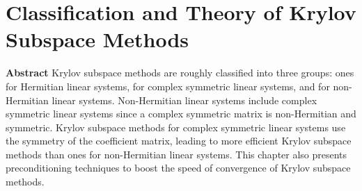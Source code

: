 \clearpage\section{{Classification and Theory of Krylov Subspace Methods}}\label{chap:krylov-classification}
\setcounter{footnote}{0}
\noindent\textbf{{Abstract}}\quad
{Krylov subspace methods are roughly classified into three groups: ones for Hermitian linear systems, for complex symmetric linear systems, and for non-Hermitian linear systems. Non-Hermitian linear systems include complex symmetric linear systems since a complex symmetric matrix is non-Hermitian and symmetric. Krylov subspace methods for complex symmetric linear systems use the symmetry of the coefficient matrix, leading to more efficient Krylov subspace methods than ones for non-Hermitian linear systems. This chapter also presents preconditioning techniques to boost the speed of convergence of Krylov subspace methods.}
